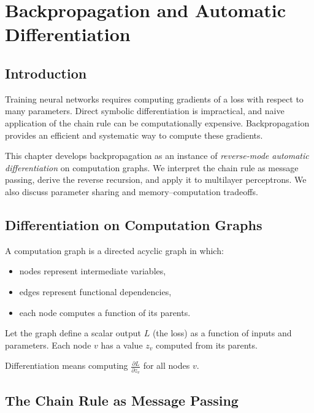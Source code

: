 \chapter{Backpropagation and Automatic Differentiation}

\section{Introduction}

Training neural networks requires computing gradients of a loss with respect to many parameters. Direct symbolic differentiation is impractical, and naive application of the chain rule can be computationally expensive. Backpropagation provides an efficient and systematic way to compute these gradients.

This chapter develops backpropagation as an instance of \emph{reverse-mode automatic differentiation} on computation graphs. We interpret the chain rule as message passing, derive the reverse recursion, and apply it to multilayer perceptrons. We also discuss parameter sharing and memory--computation tradeoffs.

\section{Differentiation on Computation Graphs}

\begin{definition}
A computation graph is a directed acyclic graph in which:
\begin{itemize}
    \item nodes represent intermediate variables,
    \item edges represent functional dependencies,
    \item each node computes a function of its parents.
\end{itemize}
\end{definition}

Let the graph define a scalar output $L$ (the loss) as a function of inputs and parameters. Each node $v$ has a value $z_v$ computed from its parents.

Differentiation means computing $\frac{\partial L}{\partial z_v}$ for all nodes $v$.

\section{The Chain Rule as Message Passing}

